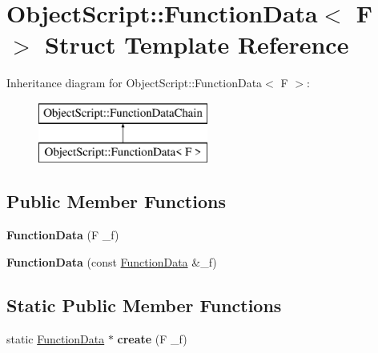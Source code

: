 \hypertarget{struct_object_script_1_1_function_data}{}\section{Object\+Script\+:\+:Function\+Data$<$ F $>$ Struct Template Reference}
\label{struct_object_script_1_1_function_data}
Inheritance diagram for Object\+Script\+:\+:Function\+Data$<$ F $>$\+:\begin{figure}[H]
\begin{center}
\leavevmode
\includegraphics[height=2.000000cm]{struct_object_script_1_1_function_data}
\end{center}
\end{figure}
\subsection*{Public Member Functions}
\begin{DoxyCompactItemize}
\item 
{\bfseries Function\+Data} (F \+\_\+f)\hypertarget{struct_object_script_1_1_function_data_adfdbd1c95eccdbad3ec0a5ba4893e294}{}\label{struct_object_script_1_1_function_data_adfdbd1c95eccdbad3ec0a5ba4893e294}

\item 
{\bfseries Function\+Data} (const \hyperlink{struct_object_script_1_1_function_data}{Function\+Data} \&\+\_\+f)\hypertarget{struct_object_script_1_1_function_data_a11f02fc1087a1d9c209741933a84e613}{}\label{struct_object_script_1_1_function_data_a11f02fc1087a1d9c209741933a84e613}

\end{DoxyCompactItemize}
\subsection*{Static Public Member Functions}
\begin{DoxyCompactItemize}
\item 
static \hyperlink{struct_object_script_1_1_function_data}{Function\+Data} $\ast$ {\bfseries create} (F \+\_\+f)\hypertarget{struct_object_script_1_1_function_data_ab5fd6895dbfeb744ecd5f8b069bf8566}{}\label{struct_object_script_1_1_function_data_ab5fd6895dbfeb744ecd5f8b069bf8566}

\end{DoxyCompactItemize}
